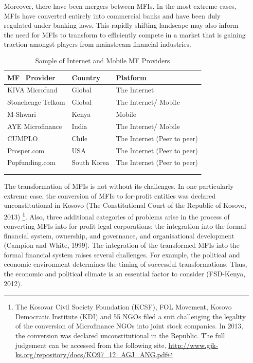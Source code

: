\documentclass[a4paper, nobind]{templates/ociamthesis}
\begin{document}
Moreover, there have been mergers between MFIs. In the most extreme cases, MFIs have converted entirely into commercial banks and have been duly regulated under banking laws. This rapidly shifting landscape may also inform the need for MFIs to transform to efficiently compete in a market that is gaining traction amongst players from mainstream financial industries.

\begin{table}

\caption{\label{tab:unnamed-chunk-4}Sample of Internet and Mobile MF Providers}
\centering
\fontsize{8}{10}\selectfont
\begin{tabu} to 
\toprule
MF\_Provider & Country & Platform\\
\midrule
KIVA Microfund & Global & The Internet\\
Stonehenge Telkom & Global & The Internet/ Mobile\\
M-Shwari & Kenya & Mobile\\
AYE Microfinance & India & The Internet/ Mobile\\
CUMPLO & Chile & The Internet (Peer to peer)\\
\addlinespace
Prosper.com & USA & The Internet (Peer to peer)\\
Popfunding.com & South Korea & The Internet (Peer to peer)\\
\bottomrule
{}\\
\\
\end{tabu}
\end{table}

The transformation of MFIs is not without its challenges. In one particularly extreme case, the conversion of MFIs to for-profit entities was declared unconstitutional in Kosovo (The Constitutional Court of the Republic of Kosovo, 2013) \footnote{The Kosovar Civil Society Foundation (KCSF), FOL Movement, Kosovo Democratic Institute (KDI) and 55 NGOs filed a suit challenging the legality of the conversion of Microfinance NGOs into joint stock companies. In 2013, the conversion was declared unconstitutional in the Republic. The full judgement can be accessed from the following site, \url{http://www.gjk-ks.org/repository/docs/KO97_12_AGJ_ANG.pdf}}. Also, three additional categories of problems arise in the process of converting MFIs into for-profit legal corporations: the integration into the formal financial system, ownership, and governance, and organisational development (Campion and White, 1999). The integration of the transformed MFIs into the formal financial system raises several challenges. For example, the political and economic environment determines the timing of successful transformations. Thus, the economic and political climate is an essential factor to consider (FSD-Kenya, 2012).
\end{document}
